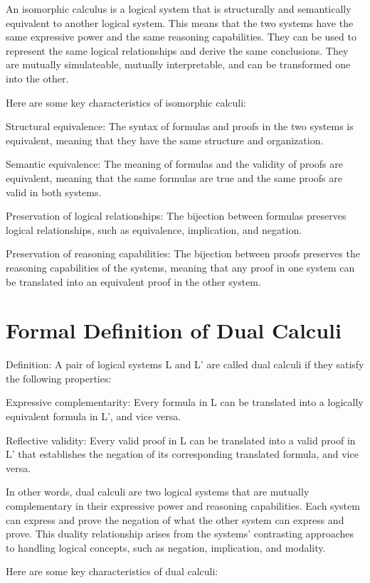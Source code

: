 An isomorphic calculus is a logical system that is structurally and semantically equivalent to another logical system. This means that the two systems have the same expressive power and the same reasoning capabilities. They can be used to represent the same logical relationships and derive the same conclusions. They are mutually simulateable, mutually interpretable, and can be transformed one into the other.

Here are some key characteristics of isomorphic calculi:

Structural equivalence: The syntax of formulas and proofs in the two systems is equivalent, meaning that they have the same structure and organization.

Semantic equivalence: The meaning of formulas and the validity of proofs are equivalent, meaning that the same formulas are true and the same proofs are valid in both systems.

Preservation of logical relationships: The bijection between formulas preserves logical relationships, such as equivalence, implication, and negation.

Preservation of reasoning capabilities: The bijection between proofs preserves the reasoning capabilities of the systems, meaning that any proof in one system can be translated into an equivalent proof in the other system.

\section{Formal Definition of Dual Calculi}
Definition: A pair of logical systems L and L' are called dual calculi if they satisfy the following properties:

Expressive complementarity: Every formula in L can be translated into a logically equivalent formula in L', and vice versa.

Reflective validity: Every valid proof in L can be translated into a valid proof in L' that establishes the negation of its corresponding translated formula, and vice versa.

In other words, dual calculi are two logical systems that are mutually complementary in their expressive power and reasoning capabilities. Each system can express and prove the negation of what the other system can express and prove. This duality relationship arises from the systems' contrasting approaches to handling logical concepts, such as negation, implication, and modality.

Here are some key characteristics of dual calculi:

